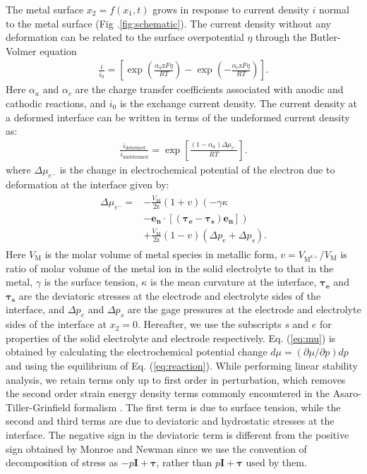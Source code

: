 \documentclass[%
reprint,
 amsmath,amssymb,
 aps,
 prb,
]{revtex4-1}
\newcommand*{\rtten}[1]{\mathbf{\boldsymbol{#1}}}
\newcommand*{\rtvec}[1]{\mathbf{#1}}
\begin{document}
The metal surface $x_2=f(x_1,t)$ grows in response to current density $i$ normal to the metal surface (Fig .\ref{fig:schematic}). The current density without any deformation can be related to the surface overpotential $\eta$ through the Butler-Volmer equation \cite{newman2012electrochemical}
\begin{eqnarray}\label{eq:i}
\frac{i}{i_0}= \left[ \exp \left(\frac{\alpha_a \mathrm{z}F \eta}{RT} \right)  - \exp \left(-\frac{\alpha_c \mathrm{z}F \eta}{RT} \right)  \right].
\end{eqnarray}
Here $\alpha_a$ and $\alpha_c$ are the charge transfer coefficients associated with anodic and cathodic reactions, and $i_0$ is the exchange current density. The current density at a deformed interface can be written in terms of the undeformed current density as:
\begin{eqnarray}\label{eq:inew}
\frac{i_{\text{deformed}}}{i_{\text{undeformed}}}=\exp\left[\frac{(1-\alpha_a)\Delta \mu_{e^-}}{RT} \right]. 
\end{eqnarray}
where $\Delta \mu_{e^-}$ is the change in electrochemical potential of the electron due to deformation at the interface given by\cite{Monroe2004Effect}:
\begin{eqnarray}\label{eq:mu}
\begin{split}
\Delta \mu_{e^-}=&-\frac{V_\mathrm{{M}}}{2\mathrm{z}}\left(1 + v \right) \left(-\gamma \kappa \right.  \\
&\left. - \rtvec{e_n}\cdot [(\rtten{\tau_e} - \rtten{\tau_s}) \rtvec{e_n}]\right)\\
& + \frac{V_\mathrm{{M}}}{2\mathrm{z}} \left(1 - v \right) \left(\Delta p_e + \Delta p_s \right).
\end{split}
\end{eqnarray}
Here $V_{\mathrm{M}}$ is the molar volume of metal species in metallic form, $v=V_\mathrm{{M^{z+}}}/V_\mathrm{{M}}$ is ratio of molar volume of the metal ion in the solid electrolyte to that in the metal, $\gamma$ is the surface tension, $\kappa$ is the mean curvature at the interface, $\rtten{\tau_e}$ and $\rtten{\tau_s} $ are the deviatoric stresses at the electrode and electrolyte sides of the interface,  and $\Delta p_e$ and $\Delta p_s$ are the gage pressures at the electrode and electrolyte sides of the interface at $x_2=0$. Hereafter, we use the subscripts $s$ and $e$ for properties of the solid electrolyte and electrode respectively. Eq. (\ref{eq:mu}) is obtained by calculating the electrochemical potential change $d\mu=(\partial \mu/\partial p) dp$ and using the equilibrium of Eq. (\ref{eq:reaction})\cite{Monroe2004Effect}. While performing linear stability analysis, we retain terms only up to first order in perturbation, which removes the second order strain energy density terms commonly encountered in the Asaro-Tiller-Grinfield formalism \cite{Asaro1972, grinfeld1986}. The first term is due to surface tension, while the second and third terms are due to deviatoric and hydrostatic stresses at the interface. The negative sign in the deviatoric term is different from the positive sign obtained by Monroe and Newman \cite{Monroe2004Effect} since we use the convention of decomposition of stress as $-p\rtten{I}+\rtten{\tau}$, rather than $p\rtten{I}+\rtten{\tau}$ used by them. 
\end{document}
